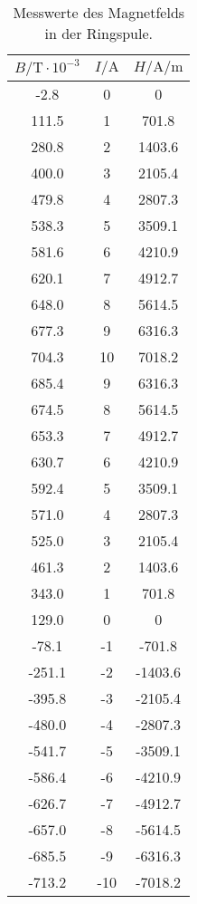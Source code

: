 \begin{table}
  \centering
  \caption{Messwerte des Magnetfelds in der Ringspule.}
  \label{tab:Hysterese}
  \begin{tabular}{c c c}
    \toprule
    $B/\unit{\tesla} \cdot 10^{-3}$ & $I/\unit{\ampere}$ & $H/\unit{\ampere}/\unit{\m}$ \\
    \midrule
    -2.8  &  0 &  0        \\
    111.5 &  1 &  701.8    \\
    280.8 &  2 &  1403.6   \\
    400.0 &  3 &  2105.4   \\
    479.8 &  4 &  2807.3   \\
    538.3 &  5 &  3509.1   \\
    581.6 &  6 &  4210.9   \\
    620.1 &  7 &  4912.7   \\
    648.0 &  8 &  5614.5   \\
    677.3 &  9 &  6316.3   \\
    704.3 &  10 & 7018.2   \\
    685.4 &  9   &    6316.3   \\
    674.5 &  8   &    5614.5   \\
    653.3 &  7   &    4912.7   \\
    630.7 &  6   &    4210.9   \\
    592.4 &  5   &    3509.1   \\
    571.0 &  4   &    2807.3   \\
    525.0 &  3   &    2105.4   \\
    461.3 &  2   &    1403.6   \\
    343.0 &  1   &    701.8    \\
    129.0 &  0   &    0        \\
    -78.1 &  -1   &   -701.8   \\
    -251.1 & -2   &   -1403.6  \\
    -395.8 & -3   &   -2105.4  \\
    -480.0 & -4   &   -2807.3  \\
    -541.7 & -5   &   -3509.1  \\
    -586.4 & -6   &   -4210.9  \\
    -626.7 & -7   &   -4912.7  \\
    -657.0 & -8   &   -5614.5  \\
    -685.5 & -9   &   -6316.3  \\
    -713.2 & -10  &   -7018.2  \\

\end{tabular}
\end{table}
